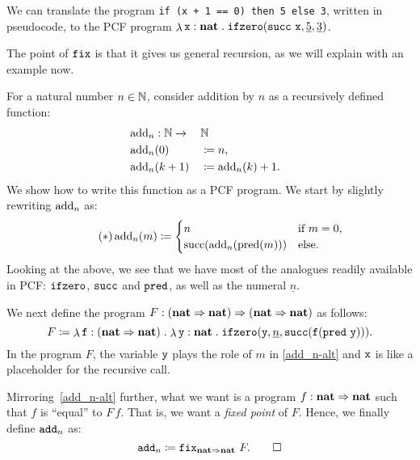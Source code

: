 \begin{example}\label{exam:ifzero}
  We can translate the program \verb|if (x + 1 == 0) then 5 else 3|, written in
  pseudocode, to the PCF program
  \(\lambdadot{\var x : \pcfnat}{\pcfifz(\pcfsuc \, \var x, \numeral 5, \numeral 3)}\).
\end{example}



The point of \(\pcffix\) is that it gives us general recursion, as we will
explain with an example now.

\begin{example}\label{exam:addition-by-n}
  For a natural number \(n \in \Nat\), consider addition by \(n\) as a
  recursively defined function:
  \begin{alignat*}{3}
    &\add_n : \Nat \to && \Nat && \\
    &\add_n(0) &&\coloneqq n, && \\
    &\add_n(k+1) &&\coloneqq \add_n(k) + 1. &&
  \end{alignat*}
  We show how to write this function as a PCF program. We start by slightly
  rewriting \(\add_n\) as:
  \begin{equation*}\label{add_n-alt}\tag{\(\ast\)}
    \add_n(m) \coloneqq
    \begin{cases}
      n &\text{if } m = 0, \\
      \suc\pa*{\add_n(\pred(m))} &\text{else}.
    \end{cases}
  \end{equation*}
  Looking at the above, we see that we have most of the analogues readily
  available in PCF: \(\pcfifz\), \(\pcfsuc\) and \(\pcfpred\), as well as the
  numeral \(\underline n\).

  We next define the program
  \(F : \pa*{\pcfnat \pcffun \pcfnat} \pcffun \pa*{\pcfnat \pcffun \pcfnat}\) as
  follows:
  \[
    F \coloneqq \lambdadot{\var f : \pa{\pcfnat \pcffun
        \pcfnat}}{\lambdadot{\var y : \pcfnat}%
      {\pcfifz\pa*{\var y,\numeral{n},%
          \pcfsuc\pa*{\var f\pa*{\pcfpred \, \var y }}}}}.
  \]
  In the program \(F\), the variable \(\var y\) plays the role of \(m\) in
  \eqref{add_n-alt} and \(\var x\) is like a placeholder for the recursive call.

  Mirroring~\eqref{add_n-alt} further, what we want is a program
  \(f : \pcfnat \pcffun \pcfnat\) such that \(f\) is ``equal'' to \(F\,f\). That
  is, we want a \emph{fixed point} of \(F\).
  Hence, we finally define \(\pcfadd_n\) as:
  \[
    \pcfadd_n \coloneqq \pcffix_{\pcfnat \pcffun \pcfnat} \, F. \qedhere
  \]
\end{example}

